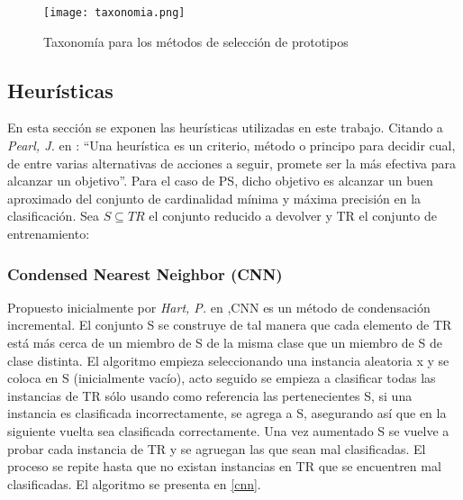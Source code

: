 \begin{figure}[]
\centering
\texttt{[image: taxonomia.png]}
\caption[Taxonomía]{Taxonomía para los métodos de selección de prototipos}
\label{taxonomia}
\end{figure}

\subsection{Heurísticas}

En esta sección se exponen las heurísticas utilizadas en este trabajo. Citando a \emph{Pearl, J.} en \cite{pearl1984heuristics}: ``Una heurística es un criterio, método o principo para decidir cual, de entre varias alternativas de acciones a seguir, promete ser la más efectiva para alcanzar un objetivo''. Para el caso de PS, dicho objetivo es alcanzar un buen aproximado del conjunto de cardinalidad mínima y máxima precisión en la clasificación. Sea $S\subseteq TR$ el conjunto reducido a devolver y TR el conjunto de entrenamiento:

\subsubsection{Condensed Nearest Neighbor (CNN)}

Propuesto inicialmente por \emph{Hart, P.} en \cite{hart1968condensed},CNN es un método de condensación incremental. El conjunto S se construye de tal manera que cada elemento de TR está más cerca de un miembro de S de la misma clase que un miembro de S de clase distinta. El algoritmo empieza seleccionando una instancia aleatoria x y se coloca en S (inicialmente vacío), acto seguido se empieza a clasificar todas las instancias de TR sólo usando como referencia las pertenecientes S, si una instancia es clasificada incorrectamente, se agrega a S, asegurando así que en la siguiente vuelta sea clasificada correctamente. Una vez aumentado S se vuelve a probar cada instancia de TR y se agruegan las que sean mal clasificadas. El proceso se repite hasta que no existan instancias en TR que se encuentren mal clasificadas. El algoritmo se presenta en \ref{cnn}. 


